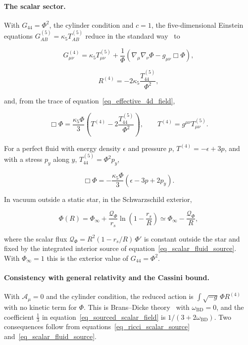 \documentclass[anonymous]{iopjournal}
\begin{document}
\paragraph{The scalar sector.} With $G_{44}=\Phi^2$, the cylinder condition and $c=1$, the five-dimensional Einstein equations $G^{(5)}_{AB}=\kappa_5T^{(5)}_{AB}$ reduce in the standard way~\cite{OverduinWesson1997} to

\begin{equation}\label{eq_effective_4d_field}
    G^{(4)}_{\mu\nu}=\kappa_5T^{(5)}_{\mu\nu}+\frac{1}{\Phi}\left(\nabla_\mu\nabla_\nu\Phi-g_{\mu\nu}\Box\Phi\right),
\end{equation}

\begin{equation}\label{eq_ricci_scalar_source}
    R^{(4)}=-2\kappa_5\frac{T^{(5)}_{44}}{\Phi^2},
\end{equation}

and, from the trace of equation~\eqref{eq_effective_4d_field},

\begin{equation}\label{eq_sourced_scalar_field}
    \Box\Phi=\frac{\kappa_5\Phi}{3}\left(T^{(4)}-2\frac{T^{(5)}_{44}}{\Phi^2}\right),
    \qquad
    T^{(4)}=g^{\mu\nu}T^{(5)}_{\mu\nu}.
\end{equation}

For a perfect fluid with energy density $\epsilon$ and pressure $p$, $T^{(4)}=-\epsilon+3p$, and with a stress $p_y$ along $y$, $T^{(5)}_{44}=\Phi^2p_y$,

\begin{equation}\label{eq_scalar_fluid_source}
    \Box\Phi=-\frac{\kappa_5\Phi}{3}\left(\epsilon-3p+2p_y\right).
\end{equation}

In vacuum outside a static star, in the Schwarzschild exterior,

\begin{equation}\label{eq_exact_exterior_scalar}
    \Phi(R)=\Phi_\infty+\frac{\mathcal{Q}_\Phi}{r_s}\ln\left(1-\frac{r_s}{R}\right)\simeq\Phi_\infty-\frac{\mathcal{Q}_\Phi}{R},
\end{equation}

where the scalar flux $\mathcal{Q}_\Phi=R^2(1-r_s/R)\,\Phi'$ is constant outside the star and fixed by the integrated interior source of equation~\eqref{eq_scalar_fluid_source}. With $\Phi_\infty=1$ this is the exterior value of $G_{44}=\Phi^2$.

\paragraph{Consistency with general relativity and the Cassini bound.} With $\mathcal{A}_\mu=0$ and the cylinder condition, the reduced action is $\int\sqrt{-g}\,\Phi R^{(4)}$ with no kinetic term for $\Phi$. This is Brans--Dicke theory~\cite{BransDicke1961} with $\omega_{\mathrm{BD}}=0$, and the coefficient $\tfrac13$ in equation~\eqref{eq_sourced_scalar_field} is $1/(3+2\omega_{\mathrm{BD}})$. Two consequences follow from equations~\eqref{eq_ricci_scalar_source} and~\eqref{eq_scalar_fluid_source}.
\end{document}
